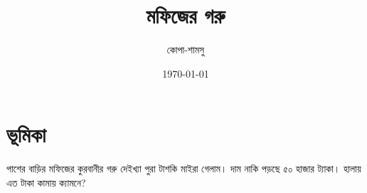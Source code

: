 \documentclass[10pt]{article}
\title{মফিজের গরু}
\author{কোপা-শামসু}
\date{\today}
\begin{document}
\maketitle

\section{ভূমিকা}
পাশের বাড়ির মফিজের কুরবানীর গরু দেইখ্যা পুরা টাশকি মাইরা গেলাম। দাম নাকি পড়ছে ৫০ হাজার ট্যাকা।
হালায় এত টাকা কামায় ক্যামনে? 
\end{document}
